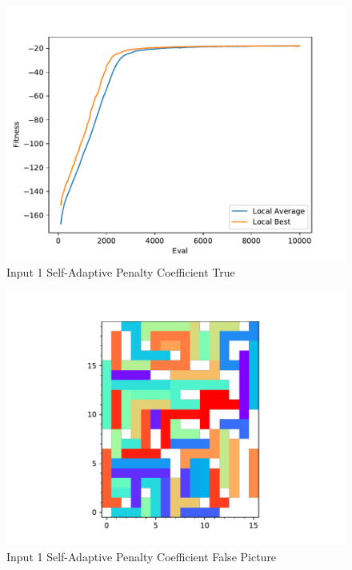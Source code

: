 \documentclass[times]{article}
\begin{document}
	\begin{figure}
		\caption{Input 1 Self-Adaptive Penalty Coefficient True}
		\label{fig:coeff1True}
		\includegraphics[width=\textwidth]{../graphs/graphs/1070}
	\end{figure}

	\begin{figure}
		\caption{Input 1 Self-Adaptive Penalty Coefficient False Picture}
		\label{fig:coeff1FalsePicture}
		\includegraphics[width=\textwidth]{../graphs/picture/1068}
	\end{figure}
\end{document}
